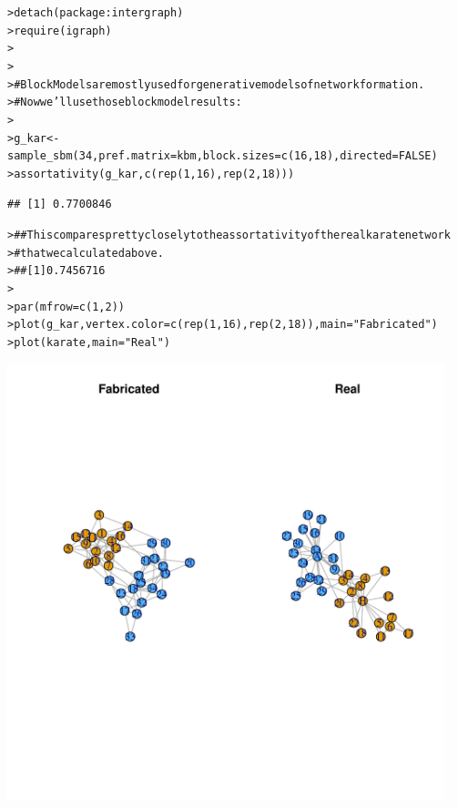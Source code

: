 \documentclass[12pt]{article}\usepackage[]{graphicx}\usepackage[]{color}
\makeatletter
\newcommand{\hlnum}[1]{\textcolor[rgb]{0.82,0.78,0.62}{#1}}%
\newcommand{\hlstr}[1]{\textcolor[rgb]{0.82,0.78,0.62}{#1}}%
\newcommand{\hlcom}[1]{\textcolor[rgb]{0.404,0.408,0.42}{#1}}%
\newcommand{\hlopt}[1]{\textcolor[rgb]{0.882,0.878,0.898}{#1}}%
\newcommand{\hlstd}[1]{\textcolor[rgb]{0.882,0.878,0.898}{#1}}%
\newcommand{\hlkwb}[1]{\textcolor[rgb]{0.902,0.675,0.196}{#1}}%
\newcommand{\hlkwc}[1]{\textcolor[rgb]{0.812,0.522,0.388}{#1}}%
\newcommand{\hlkwd}[1]{\textcolor[rgb]{0.733,0.388,0.812}{#1}}%
\newenvironment{kframe}{%
 \def\at@end@of@kframe{}%
 \ifinner\ifhmode%
  \def\at@end@of@kframe{\end{minipage}}%
  \begin{minipage}{\columnwidth}%
 \fi\fi%
 \def\FrameCommand##1{\hskip\@totalleftmargin \hskip-\fboxsep
 \colorbox{shadecolor}{##1}\hskip-\fboxsep
     \hskip-\linewidth \hskip-\@totalleftmargin \hskip\columnwidth}%
 \MakeFramed {\advance\hsize-\width
   \@totalleftmargin\z@ \linewidth\hsize
   \@setminipage}}%
 {\par\unskip\endMakeFramed%
 \at@end@of@kframe}
\newenvironment{knitrout}{}{} %
\makeatother
\begin{document}
\begin{flushleft}
\begin{center}
\begin{knitrout}
\begin{kframe}
{\ttfamily\noindent\bfseries\color{errorcolor}{\#\# Error: package 'sna' is required by 'statnet' so will not be detached}}\begin{alltt}
\hlstd{> }\hlkwd{detach}\hlstd{(package}\hlopt{:}\hlstd{intergraph)}
\hlstd{> }\hlkwd{require}\hlstd{(igraph)}
\hlstd{> }
\hlstd{> }
\hlstd{> }\hlcom{#  BlockModels are mostly used for generative models of network formation.}
\hlstd{> }\hlcom{#    Now we'll use those block model results:}
\hlstd{> }
\hlstd{> }\hlstd{g_kar} \hlkwb{<-} \hlkwd{sample_sbm}\hlstd{(}\hlnum{34}\hlstd{,} \hlkwc{pref.matrix} \hlstd{= kbm,} \hlkwc{block.sizes} \hlstd{=} \hlkwd{c}\hlstd{(}\hlnum{16}\hlstd{,}\hlnum{18}\hlstd{),} \hlkwc{directed} \hlstd{=} \hlnum{FALSE}\hlstd{)}
\hlstd{> }\hlkwd{assortativity}\hlstd{(g_kar,} \hlkwd{c}\hlstd{(}\hlkwd{rep}\hlstd{(}\hlnum{1}\hlstd{,}\hlnum{16}\hlstd{),} \hlkwd{rep}\hlstd{(}\hlnum{2}\hlstd{,}\hlnum{18}\hlstd{)))}
\end{alltt}
\begin{verbatim}
## [1] 0.7700846
\end{verbatim}
\begin{alltt}
\hlstd{> }\hlcom{## This compares pretty closely to the assortativity of the real karate network}
\hlstd{> }\hlcom{#      that we calculated above.}
\hlstd{> }\hlcom{## [1] 0.7456716}
\hlstd{> }
\hlstd{> }\hlkwd{par}\hlstd{(}\hlkwc{mfrow}\hlstd{=}\hlkwd{c}\hlstd{(}\hlnum{1}\hlstd{,}\hlnum{2}\hlstd{))}
\hlstd{> }\hlkwd{plot}\hlstd{(g_kar,} \hlkwc{vertex.color} \hlstd{=} \hlkwd{c}\hlstd{(}\hlkwd{rep}\hlstd{(}\hlnum{1}\hlstd{,}\hlnum{16}\hlstd{),} \hlkwd{rep}\hlstd{(}\hlnum{2}\hlstd{,}\hlnum{18}\hlstd{)),} \hlkwc{main} \hlstd{=} \hlstr{"Fabricated"}\hlstd{)}
\hlstd{> }\hlkwd{plot}\hlstd{(karate,} \hlkwc{main} \hlstd{=} \hlstr{"Real"}\hlstd{)}
\end{alltt}
\end{kframe}
\includegraphics[width=5in]{figure/Assort-12} 

\end{knitrout}
\end{center}
\end{flushleft}
\end{document}
